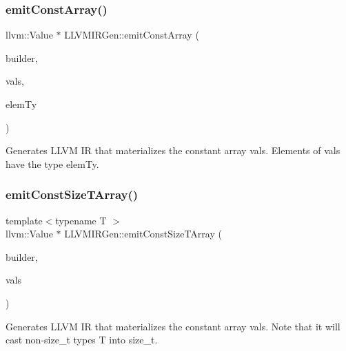 \subsubsection{\texorpdfstring{emit\+Const\+Array()}{emitConstArray()}}
{\footnotesize\ttfamily llvm\+::\+Value $\ast$ L\+L\+V\+M\+I\+R\+Gen\+::emit\+Const\+Array (\begin{DoxyParamCaption}\item[{llvm\+::\+I\+R\+Builder$<$$>$ \&}]{builder,  }\item[{llvm\+::\+Array\+Ref$<$ llvm\+::\+Constant $\ast$$>$}]{vals,  }\item[{llvm\+::\+Type $\ast$}]{elem\+Ty }\end{DoxyParamCaption})\hspace{0.3cm}{\ttfamily [protected]}}

Generates L\+L\+VM IR that materializes the constant array {\ttfamily vals}. Elements of vals have the type {\ttfamily elem\+Ty}. \mbox{\label{classglow_1_1_l_l_v_m_i_r_gen_ada77060511b9c2cb322c04f88b414626}} 
\subsubsection{\texorpdfstring{emit\+Const\+Size\+T\+Array()}{emitConstSizeTArray()}}
{\footnotesize\ttfamily template$<$typename T $>$ \\
llvm\+::\+Value $\ast$ L\+L\+V\+M\+I\+R\+Gen\+::emit\+Const\+Size\+T\+Array (\begin{DoxyParamCaption}\item[{llvm\+::\+I\+R\+Builder$<$$>$ \&}]{builder,  }\item[{llvm\+::\+Array\+Ref$<$ T $>$}]{vals }\end{DoxyParamCaption})\hspace{0.3cm}{\ttfamily [protected]}}

Generates L\+L\+VM IR that materializes the constant array {\ttfamily vals}. Note that it will cast non-\/size\+\_\+t types T into size\+\_\+t. \mbox{\label{classglow_1_1_l_l_v_m_i_r_gen_ae8c55abb7ab22bd32aee5d3472606475}} 
